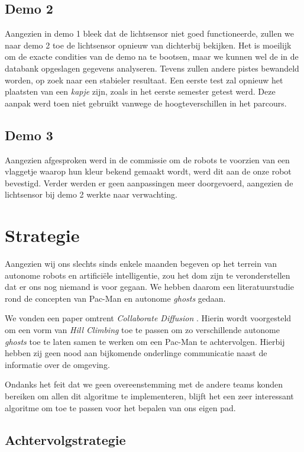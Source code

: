 \documentclass[12pt,a4paper]{report}
\begin{document}
\section{Demo 2}

Aangezien in demo 1 bleek dat de lichtsensor niet goed functioneerde, zullen we naar demo 2 toe de lichtsensor opnieuw van dichterbij bekijken. Het is moeilijk om de exacte condities van de demo na te bootsen, maar we kunnen wel de in de databank opgeslagen gegevens analyseren. Tevens zullen andere pistes bewandeld worden, op zoek naar een stabieler resultaat. Een eerste test zal opnieuw het plaatsten van een \emph{kapje} zijn, zoals in het eerste semester getest werd. Deze aanpak werd toen niet gebruikt vanwege de hoogteverschillen in het parcours. 

\section{Demo 3}

Aangezien afgesproken werd in de commissie om de robots te voorzien van een vlaggetje waarop hun kleur bekend gemaakt wordt, werd dit aan de onze robot bevestigd. Verder werden er geen aanpassingen meer doorgevoerd, aangezien de lichtsensor bij demo 2 werkte naar verwachting.

\chapter{Strategie}

Aangezien wij ons slechts sinds enkele maanden begeven op het terrein van autonome robots en artifici\"ele intelligentie, zou het dom zijn te veronderstellen dat er ons nog niemand is voor gegaan. We hebben daarom een literatuurstudie rond de concepten van Pac-Man en autonome \emph{ghosts} gedaan.

We vonden een paper omtrent \emph{Collaborate Diffusion} \cite{Repenning06}. Hierin wordt voorgesteld om een vorm van \emph{Hill Climbing} toe te passen om zo verschillende autonome \emph{ghosts} toe te laten samen te werken om een Pac-Man te achtervolgen. Hierbij hebben zij geen nood aan bijkomende onderlinge communicatie naast de informatie over de omgeving.

Ondanks het feit dat we geen overeenstemming met de andere teams konden bereiken om allen dit algoritme te implementeren, blijft het een zeer interessant algoritme om toe te passen voor het bepalen van ons eigen pad.

\section{Achtervolgstrategie}
\end{document}
